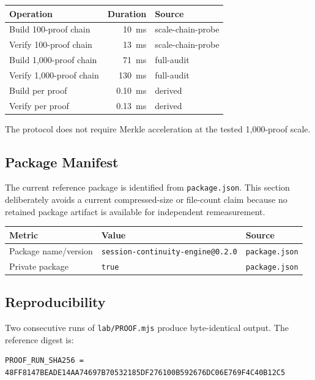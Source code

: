 \documentclass[11pt,a4paper]{article}
\begin{document}
\begin{table}[h]
\centering
\begin{tabular}{@{}lrl@{}}
\toprule
Operation & Duration & Source \\
\midrule
Build 100-proof chain & 10~ms & scale-chain-probe \\
Verify 100-proof chain & 13~ms & scale-chain-probe \\
Build 1{,}000-proof chain & 71~ms & full-audit \\
Verify 1{,}000-proof chain & 130~ms & full-audit \\
Build per proof & 0.10~ms & derived \\
Verify per proof & 0.13~ms & derived \\
\bottomrule
\end{tabular}
\end{table}

The protocol does not require Merkle acceleration at the tested 1{,}000-proof scale.

\subsection{Package Manifest}

The current reference package is identified from \texttt{package.json}. This section deliberately avoids a current compressed-size or file-count claim because no retained package artifact is available for independent remeasurement.

\begin{table}[h]
\centering
\begin{tabular}{lll}
\toprule
Metric & Value & Source \\
\midrule
Package name/version & \texttt{session-continuity-engine@0.2.0} & \texttt{package.json} \\
Private package & \texttt{true} & \texttt{package.json} \\
\bottomrule
\end{tabular}
\end{table}

\subsection{Reproducibility}

Two consecutive runs of \texttt{lab/PROOF.mjs} produce byte-identical output. The reference digest is:

\begin{lstlisting}
PROOF_RUN_SHA256 = 48FF8147BEADE14AA74697B70532185DF276100B592676DC06E769F4C40B12C5
\end{lstlisting}
\end{document}
